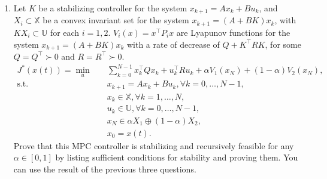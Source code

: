 \begin{enumerate}
    \item Let $K$ be a stabilizing controller for the system $x_{k+1} = Ax_k + Bu_k$, and $X_i\subset \mathbb{X}$ be a convex invariant set for the system $x_{k+1} = (A+BK)x_k$, with $KX_i\subset \mathbb{U}$ for each $i = 1,2$. $V_i(x) = x^{\top}P_ix$ are Lyapunov functions for the system $x_{k+1} = (A+BK)x_k$ with a rate of decrease of $Q+K^{\top}RK$, for some $Q = Q^{\top}\succ 0$ and $R = R^{\top} \succ 0$.
    \begin{align*}
        J^*(x(t)) = \min_u \quad&\sum_{k=0}^{N-1} x_k^{\top}Qx_k + u_k^{\top}Ru_k + \alpha V_1(x_N) + (1-\alpha)V_2(x_N),\\
        \text{s.t.}\quad & x_{k+1} = Ax_k + Bu_k, \forall k  = 0,\hdots, N-1,\\
        &x_k \in \mathbb{X},\forall k  = 1,\hdots, N,\\
        &u_k \in \mathbb{U},\forall k  = 0,\hdots, N-1,\\
        &x_N \in \alpha X_1 \oplus (1-\alpha)X_2,\\
        &x_0 = x(t).
    \end{align*}
    Prove that this MPC controller is stabilizing and recursively feasible for any $\alpha \in [0,1]$ by listing sufficient conditions for stability and proving them. You can use the result of the previous three questions.

\end{enumerate}